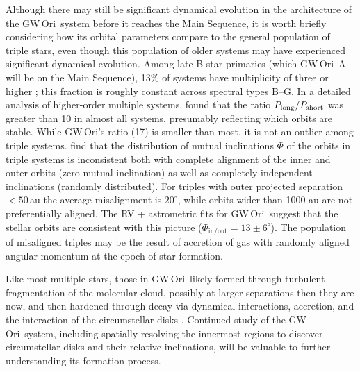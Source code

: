 \documentclass[twocolumn]{aastex61}
\newcommand{\obj}{GW\,Ori}
\begin{document}
Although there may still be significant dynamical evolution in the architecture of the \obj\ system before it reaches the Main Sequence, it is worth briefly considering how its orbital parameters compare to the general population of triple stars, even though this population of older systems may have experienced significant dynamical evolution. Among late B star primaries (which \obj~A will be on the Main Sequence), 13\% of systems have multiplicity of three or higher \citep{eggleton08}; this fraction is roughly constant across spectral types B--G. In a detailed analysis of higher-order multiple systems, \citet{tokovinin97} found that the ratio $P_\mathrm{long} / P_{\rm short}$ was greater than 10 in almost all systems, presumably reflecting which orbits are stable. While \obj's ratio (17) is smaller than most, it is not an outlier among triple systems.
\citet{tokovinin97,tokovinin17} find that the distribution of mutual inclinations $\Phi$ of the orbits in triple systems is inconsistent both with complete alignment of the inner and outer orbits (zero mutual inclination) as well as completely independent inclinations (randomly distributed).
For triples with outer projected separation $< 50\,$au the average misalignment is $20^\circ$, while orbits wider than 1000 au are not preferentially aligned.
The RV + astrometric fits for \obj\ suggest that the stellar orbits are consistent with this picture ($\Phi_\mathrm{in/out} = 13 \pm 6^\circ$).
The population of misaligned triples may be the result of accretion of gas with randomly aligned angular momentum at the epoch of star formation.

Like most multiple stars, those in \obj\ likely formed through turbulent fragmentation of the molecular cloud, possibly at larger separations then they are now, and then hardened through decay via dynamical interactions, accretion, and the interaction of the circumstellar disks \citep{offner10,bate12}. Continued study of the \obj\ system, including spatially resolving the innermost regions to discover circumstellar disks and their relative inclinations, will be valuable to further understanding its formation process.

\end{document}
